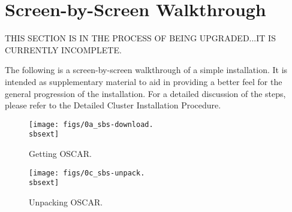 %
%
%


\newpage

\section{Screen-by-Screen Walkthrough}
\label{app:screen-by-screen}

{\large THIS SECTION IS IN THE PROCESS OF BEING UPGRADED...IT IS
CURRENTLY INCOMPLETE.}

The following is a screen-by-screen walkthrough of a simple installation.
It is intended as supplementary material to aid in providing a better feel
for the general progression of the installation.  For a detailed discussion
of the steps, please refer to the Detailed Cluster Installation Procedure.

\setlength{\oddsidemargin}{-0.5in}
\setlength{\evensidemargin}{-0.5in}
\setlength{\textwidth}{7.5in}

\begin{figure}[htbp]
  \begin{center}
    \texttt{[image: figs/0a\_sbs-download.\\sbsext]}
    \caption{Getting OSCAR.}
    \label{fig:sbs-getting-oscar}
  \end{center}
\end{figure}


\begin{figure}[htbp]
  \begin{center}
    \texttt{[image: figs/0c\_sbs-unpack.\\sbsext]}
    \caption{Unpacking OSCAR.}
    \label{fig:sbs-unpacking-oscar}
  \end{center}
\end{figure}

